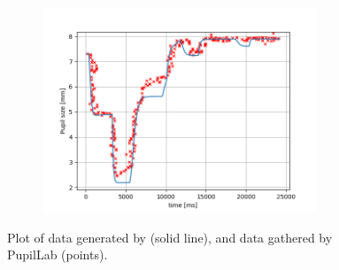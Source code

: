 \documentclass[USenglish,twocolumn]{article}
\begin{document}
\begin{figure}[H]
	\begin{subfigure}[b]{0.45\textwidth}
		\centering
		\includegraphics[width=0.9\textwidth]{img/Experiment/StairCase.png}
		\caption{}
		\label{fig:experiment3}
	\end{subfigure}
	\caption{Plot of data generated by \cite{Pamplona} (solid line), and data gathered by PupilLab (points).}	
	\label{fig:experiment}
\end{figure}
\iffalse
\end{document}
